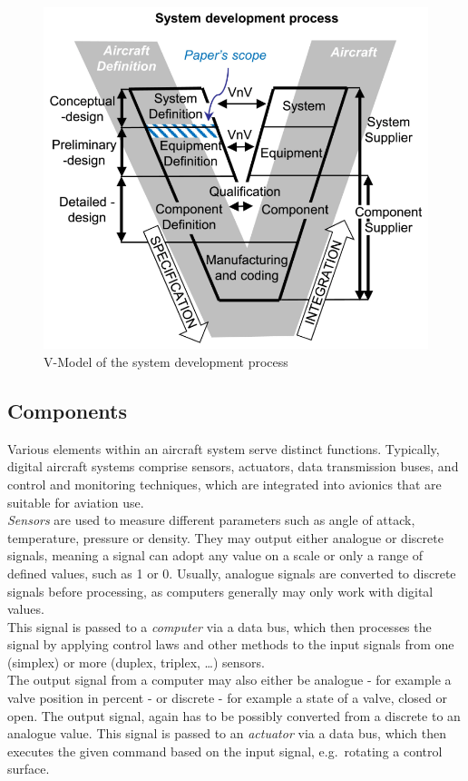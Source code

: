 \begin{figure}
    \centering
    \includegraphics[width=\textwidth]{Pictures/res/fundamentals/v-modell}
    \caption{V-Model of the system development process~\cite{doi:10.1177/09544100211024787}}
    \label{fig:v-model}
\end{figure}
\subsection{Components}\label{subsec:components}
Various elements within an aircraft system serve distinct functions.
Typically, digital aircraft systems comprise sensors, actuators, data transmission buses,
and control and monitoring techniques, which are integrated into avionics that are suitable for aviation use.
\\
\textit{Sensors} are used to measure different parameters such as angle of attack, temperature, pressure or density.
They may output either analogue or discrete signals, meaning a signal can adopt any value on a scale or only a range of defined values,
such as 1 or 0.
Usually, analogue signals are converted to discrete signals before processing, as computers generally may only work with digital
values.
\\
This signal is passed to a \textit{computer} via a data bus, which then processes the signal by applying control laws and other methods to the
input signals from one (simplex) or more (duplex, triplex, \ldots) sensors.
\\
The output signal from a computer may also either be analogue - for example a valve position in percent - or discrete - for
example a state of a valve, closed or open.
The output signal, again has to be possibly converted from a discrete to an analogue value.
This signal is passed to an \textit{actuator} via a data bus, which then executes the given command based on the input signal,
e.g.\ rotating a control surface.


